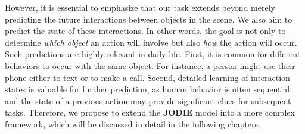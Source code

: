 However, it is essential to emphasize that our task extends beyond merely predicting the future interactions between objects in the scene. We also aim to predict the state of these interactions. In other words, the goal is not only to determine \textit{which object} an action will involve but also \textit{how} the action will occur. Such predictions are highly relevant in daily life. First, it is common for different behaviors to occur with the same object. For instance, a person might use their phone either to text or to make a call. Second, detailed learning of interaction states is valuable for further prediction, as human behavior is often sequential, and the state of a previous action may provide significant clues for subsequent tasks. Therefore, we propose to extend the \textbf{JODIE} model into a more complex framework, which will be discussed in detail in the following chapters.